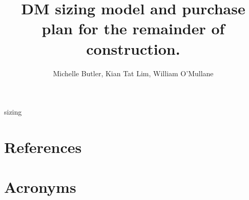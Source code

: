 \documentclass[DM,authoryear,toc]{lsstdoc}
\title{DM sizing model and purchase plan for the remainder of construction.}
\author{%
Michelle Butler, Kian Tat Lim, William O'Mullane
}
\date{\vcsDate}
\begin{document}
\mkshorttitle



 {sizing}
\appendix
\section{References} \label{sec:bib}


\section{Acronyms} \label{sec:acronyms}

\end{document}
